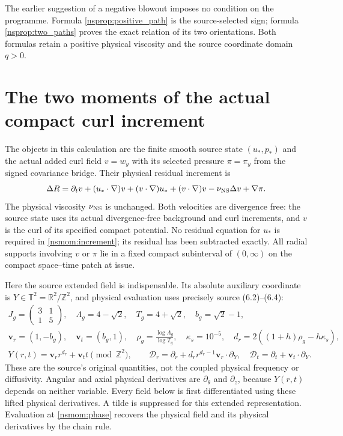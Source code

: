 \documentclass[11pt]{article}
\begin{document}
The earlier suggestion of a negative blowout imposes no condition on
the programme. Formula \eqref{nsprop:positive_path} is the source-selected
sign; formula \eqref{nsprop:two_paths} proves the exact relation of its
two orientations. Both formulas retain a positive physical viscosity
and the source coordinate domain $q>0$.


\section{The two moments of the actual compact curl increment}
\label{nsmom:setup}
The objects in this calculation are the finite smooth source state
$(u_*,p_*)$ and the actual added curl field $v=w_y$ with its selected
pressure $\pi=\pi_y$ from the signed covariance bridge. Their physical
residual increment is
\begin{equation}
 \Delta R=\partial_t v+(u_*\cdot\nabla)v+(v\cdot\nabla)u_*
 +(v\cdot\nabla)v-\nu_{\rm NS}\Delta v+\nabla\pi .
 \label{nsmom:increment}
\end{equation}
The physical viscosity $\nu_{\rm NS}$ is unchanged. Both velocities are
divergence free: the source state uses its actual divergence-free
background and curl increments, and $v$ is the curl of its specified
compact potential. No residual equation for $u_*$ is required in
\eqref{nsmom:increment}; its residual has been subtracted exactly.
All radial supports involving $v$ or $\pi$ lie in a fixed compact
subinterval of $(0,\infty)$ on the compact space--time patch at issue.

Here the source extended field is indispensable. Its absolute auxiliary
coordinate is $Y\in\mathbb T^2=\mathbb R^2/\mathbb Z^2$, and physical
evaluation uses precisely source (6.2)--(6.4):
\begin{gather}
 J_g=\begin{pmatrix}3&1\\1&5\end{pmatrix},\quad
 \Lambda_g=4-\sqrt2,\quad T_g=4+\sqrt2,\quad b_g=\sqrt2-1,\nonumber\\
 \mathbf v_r=(1,-b_g),\quad\mathbf v_t=(b_g,1),\quad
 \rho_g=\frac{\log\Lambda_g}{\log T_g},\quad
 \kappa_s=10^{-5},\quad d_r=2((1+h)\rho_g-h\kappa_s),\nonumber\\
 Y(r,t)=\mathbf v_r r^{d_r}+\mathbf v_t t\pmod{\mathbb Z^2},\qquad
 \mathscr D_r=\partial_r+d_r r^{d_r-1}\mathbf v_r\cdot\partial_Y,
 \quad\mathscr D_t=\partial_t+\mathbf v_t\cdot\partial_Y.
 \label{nsmom:phase}
\end{gather}
These are the source's original quantities, not the coupled physical
frequency or diffusivity. Angular and axial physical derivatives are
$\partial_\theta$ and $\partial_z$, because $Y(r,t)$ depends on neither
variable. Every field below is first differentiated using these lifted
physical derivatives. A tilde is suppressed for this extended
representation. Evaluation at \eqref{nsmom:phase} recovers the physical
field and its physical derivatives by the chain rule.
\end{document}
